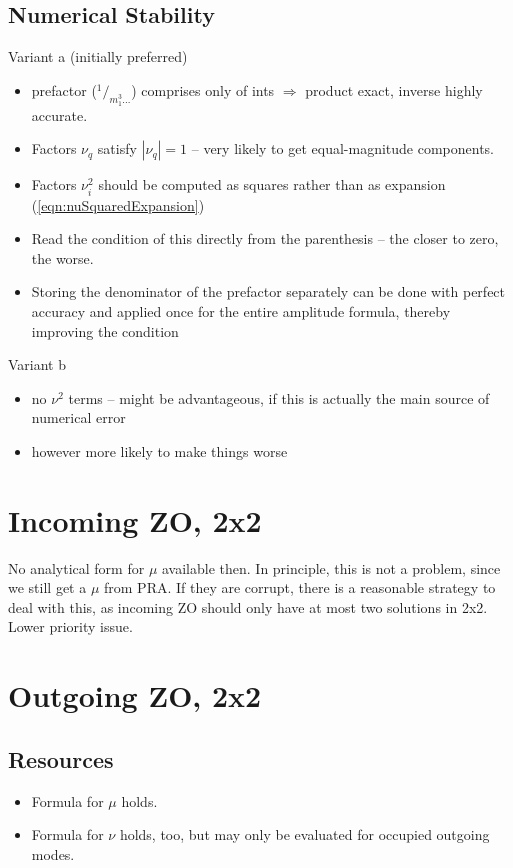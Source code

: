 \documentclass[
	english,
	a4paper,
	fontsize=10pt,
	parskip=half,
	titlepage=true,
	DIV=12,
	final
]{scrreprt}
\newcommand*{\Thus}{\ensuremath{\Rightarrow}\xspace}
\newcommand*{\smallfrac}  [2]{\ensuremath{{}^        {#1} \!/_        {#2}}}
\begin{document}
\subsection{Numerical Stability}
Variant a (initially preferred)
\begin{itemize}
\item prefactor (\smallfrac{1}{m_1^3...}) comprises only of ints \Thus product exact, inverse highly accurate.
\item Factors $\nu_q$ satisfy $|\nu_q| = 1$ -- very likely to get equal-magnitude components.
\item Factors $\nu_i^2$ should be computed as squares rather than as expansion (\ref{eqn:nuSquaredExpansion})
\item Read the condition of this directly from the parenthesis -- the closer to zero, the worse.
\item Storing the denominator of the prefactor separately can be done with perfect accuracy and applied once for the entire amplitude formula, thereby improving the condition
\end{itemize}

Variant b
\begin{itemize}
\item no $\nu^2$ terms -- might be advantageous, if this is actually the main source of numerical error
\item however more likely to make things worse
\end{itemize}

\section{Incoming ZO, 2x2}
No analytical form for $\mu$ available then. In principle, this is not a problem, since we still get a $\mu$ from PRA. If they are corrupt, there is a reasonable strategy to deal with this, as incoming ZO should only have at most two solutions in 2x2. Lower priority issue.

\section{Outgoing ZO, 2x2}
\subsection{Resources}
\begin{itemize}
\item Formula for $\mu$ holds.
\item Formula for $\nu$ holds, too, but may only be evaluated for occupied outgoing modes.
\end{itemize}
\end{document}
